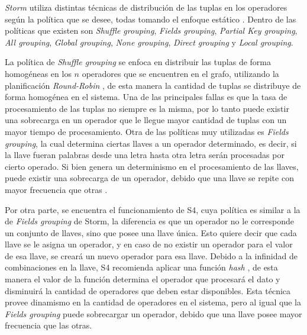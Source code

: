 \textsl{Storm} utiliza distintas técnicas de distribución de las tuplas en los operadores según la política que se desee, todas tomando el enfoque estático \citep{stormtwitter}. Dentro de las políticas que existen son \textit{Shuffle grouping}, \textit{Fields grouping}, \textit{Partial Key grouping}, \textit{All grouping}, \textit{Global grouping}, \textit{None grouping}, \textit{Direct grouping} y \textit{Local grouping}.

La política de \textit{Shuffle grouping} se enfoca en distribuir las tuplas de forma homogéneas en los $n$ operadores que se encuentren en el grafo, utilizando la planificación \textit{Round-Robin} \citep{bookScheduling}, de esta manera la cantidad de tuplas se distribuye de forma homogénea en el sistema. Una de las principales fallas es que la tasa de procesamiento de las tuplas no siempre es la misma, por lo tanto puede existir una sobrecarga en un operador que le llegue mayor cantidad de tuplas con un mayor tiempo de procesamiento. Otra de las políticas muy utilizadas es \textit{Fields grouping}, la cual determina ciertas llaves a un operador determinado, es decir, si la llave fueran palabras desde una letra hasta otra letra serán procesadas por cierto operado. Si bien genera un determinismo en el procesamiento de las llaves, puede existir una sobrecarga de un operador, debido que una llave se repite con mayor frecuencia que otras \citep{bookstorm}.


Por otra parte, se encuentra el funcionamiento de S4, cuya política es similar a la de \textit{Fields grouping} de Storm, la diferencia es que un operador no le corresponde un conjunto de llaves, sino que posee una llave única. Esto quiere decir que cada llave se le asigna un operador, y en caso de no existir un operador para el valor de esa llave, se creará un nuevo operador para esa llave. Debido a la infinidad de combinaciones en la llave, S4 recomienda aplicar una función \textit{hash} \citep{RogawayS04}, de esta manera el valor de la función determina el operador que procesará el dato y disminuirá la cantidad de operadores que deben estar disponibles. Esta técnica provee dinamismo en la cantidad de operadores en el sistema, pero al igual que la \textit{Fields grouping} puede sobrecargar un operador, debido que una llave posee mayor frecuencia que las otras.

